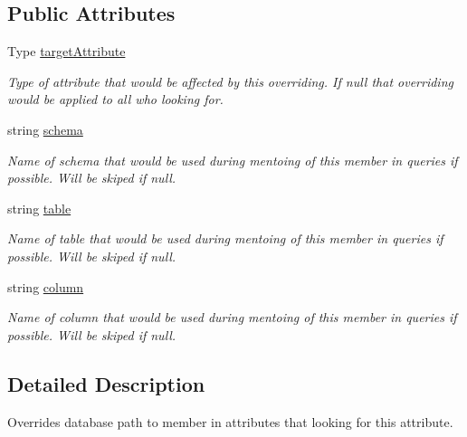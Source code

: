 \subsection*{Public Attributes}
\begin{DoxyCompactItemize}
\item 
Type \mbox{\hyperlink{class_uniform_data_operator_1_1_sql_1_1_markup_1_1_modifiers_1_1_d_b_path_override_attribute_ad6b2408b337cc95c58034f0130c89ac8}{target\+Attribute}}
\begin{DoxyCompactList}\small\item\em Type of attribute that would be affected by this overriding. If null that overriding would be applied to all who looking for. \end{DoxyCompactList}\item 
string \mbox{\hyperlink{class_uniform_data_operator_1_1_sql_1_1_markup_1_1_modifiers_1_1_d_b_path_override_attribute_ae30de021946efb358325415cf7e1bde2}{schema}}
\begin{DoxyCompactList}\small\item\em Name of schema that would be used during mentoing of this member in queries if possible. Will be skiped if null. \end{DoxyCompactList}\item 
string \mbox{\hyperlink{class_uniform_data_operator_1_1_sql_1_1_markup_1_1_modifiers_1_1_d_b_path_override_attribute_a3f5c9e2892d5061f92d59d17b2636acb}{table}}
\begin{DoxyCompactList}\small\item\em Name of table that would be used during mentoing of this member in queries if possible. Will be skiped if null. \end{DoxyCompactList}\item 
string \mbox{\hyperlink{class_uniform_data_operator_1_1_sql_1_1_markup_1_1_modifiers_1_1_d_b_path_override_attribute_a30bd9209a06db42db371c857573af3be}{column}}
\begin{DoxyCompactList}\small\item\em Name of column that would be used during mentoing of this member in queries if possible. Will be skiped if null. \end{DoxyCompactList}\end{DoxyCompactItemize}


\subsection{Detailed Description}
Overrides database path to member in attributes that looking for this attribute. 



